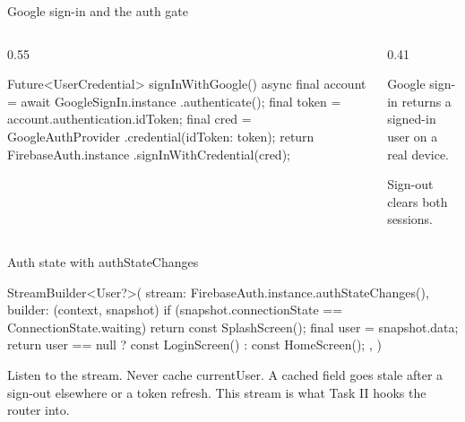 \documentclass[10pt,aspectratio=169,t]{beamer}
\begin{document}
\begin{frame}[fragile,eyebrow=Task I]{Google sign-in and the auth gate}
  \begin{columns}[T]
    \begin{column}{0.55\textwidth}
\begin{dart}
Future<UserCredential>
    signInWithGoogle() async {
  final account =
      await GoogleSignIn.instance
          .authenticate();
  final token =
      account.authentication.idToken;
  final cred = GoogleAuthProvider
      .credential(idToken: token);
  return FirebaseAuth.instance
      .signInWithCredential(cred);
}
\end{dart}
    \end{column}
    \begin{column}{0.41\textwidth}
      \begin{checklist}
        \item Google sign-in returns a signed-in user on a real device.
        \item Sign-out clears both sessions.
      \end{checklist}
      \vskip 3mm
    \end{column}
  \end{columns}
\end{frame}

\begin{frame}[fragile,eyebrow=Task I]{Auth state with authStateChanges}
\begin{dart}
StreamBuilder<User?>(
  stream: FirebaseAuth.instance.authStateChanges(),
  builder: (context, snapshot) {
    if (snapshot.connectionState == ConnectionState.waiting) {
      return const SplashScreen();
    }
    final user = snapshot.data;
    return user == null ? const LoginScreen() : const HomeScreen();
  },
)
\end{dart}
  \begin{takeaway}{Listen to the stream. Never cache currentUser.}
    A cached field goes stale after a sign-out elsewhere or a token refresh. This stream is what Task II hooks the router into.
  \end{takeaway}
\end{frame}
\end{document}

